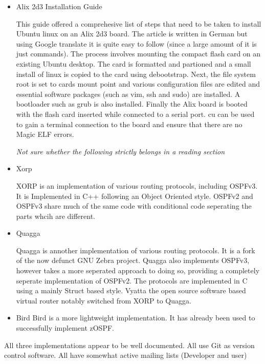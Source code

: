 \documentclass[12pt]{report}
\begin{document}
	\begin{itemize}

	\item Alix 2d3 Installation Guide

	This guide offered a comprehesive list of steps that need to be taken to
	install Ubuntu linux on an Alix 2d3 board.  The article is written in
	German but using Google translate it is quite easy to follow (since a
	large amount of it is just commands).  The process involves mounting the
	compact flash card on an existing Ubuntu desktop.  The card is formatted
	and partioned and a small install of linux is copied to the card using
	debootstrap.  Next, the file system root is set to cards mount point and
	various configuration files are edited and essential software packages
	(such as vim, ssh and sudo) are installed. A bootloader such as grub is
	also installed.  Finally the Alix board is booted with the flash card
	inserted while connected to a serial port.  cu can be used to gain a
	terminal connection to the board and ensure that there are no Magic ELF
	errors. 

	\em Not sure whether the following strictly belongs in a reading section
	\em

	\item Xorp
	
	XORP is an implementation of various routing protocols, including
	OSPFv3.  It is Implemented in C++ following an Object Oriented style.
	OSPFv2 and OSPFv3 share much of the same code with conditional code
	seperating the parts whcih are different.
	
	\item Quagga
	
	Quagga is annother implementation of various routing protocols.  It is a
	fork of the now defunct GNU Zebra project.  Quagga also implements
	OSPFv3, however takes a more seperated approach to doing so, providing a
	completely seperate implementation of OSPFv2. 	The protocols are
	implemented in C  using a mainly Struct based style.  Vyatta the open
	source software based virtual router notably switched from XORP to
	Quagga. 

	\item Bird
	Bird is a more lightweight implementation.  It has already been used to
	successfully implement zOSPF.

\end{itemize}

	All three implementations appear to be well documented.  All use Git as
	version control software.  All have somewhat active mailing lists
	(Developer and user)
\end{document}
